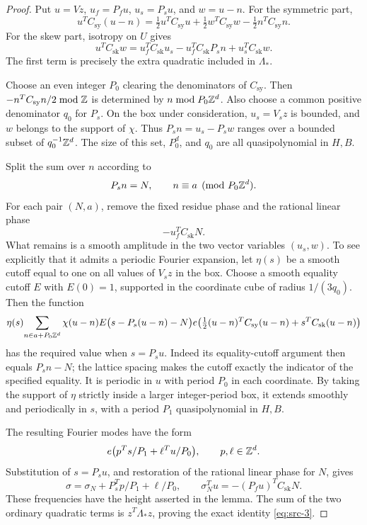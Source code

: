 \begin{proof}
Put \(u=Vz\), \(u_f=P_fu\), \(u_s=P_su\), and \(w=u-n\).
For the symmetric part,
\[
 u^TC_{\mathrm{sy}}(u-n)
 =\tfrac12u^TC_{\mathrm{sy}}u
  +\tfrac12w^TC_{\mathrm{sy}}w
  -\tfrac12n^TC_{\mathrm{sy}}n.
\]
For the skew part, isotropy on \(U\) gives
\[
 u^TC_{\mathrm{sk}}w
 =u_f^TC_{\mathrm{sk}}u_s
   -u_f^TC_{\mathrm{sk}}P_sn
   +u_s^TC_{\mathrm{sk}}w.
\]
The first term is precisely the extra quadratic included in
\(\Lambda_*\).

Choose an even integer \(P_0\) clearing the denominators of
\(C_{\mathrm{sy}}\).  Then
\(-n^TC_{\mathrm{sy}}n/2\bmod\mathbb Z\) is determined by
\(n\bmod P_0\mathbb Z^d\).
Also choose a common positive denominator \(q_0\) for \(P_s\).
On the box under consideration, \(u_s=V_sz\) is bounded, and
\(w\) belongs to the support of \(\chi\).
Thus \(P_sn=u_s-P_sw\) ranges over a bounded subset of
\(q_0^{-1}\mathbb Z^d\).  The size of this set, \(P_0^d\), and
\(q_0\) are all quasipolynomial in \(H,B\).

Split the sum over \(n\) according to
\[
 P_sn=N,\qquad n\equiv a\pmod{P_0\mathbb Z^d}.
\]
For each pair \((N,a)\), remove the fixed residue phase and the rational
linear phase
\[
 -u_f^TC_{\mathrm{sk}}N.
\]
What remains is a smooth amplitude in the two vector variables
\((u_s,w)\).  To see explicitly that it admits a periodic Fourier
expansion, let \(\eta(s)\) be a smooth cutoff equal to one on all
values of \(V_sz\) in the box.  Choose a smooth equality cutoff \(E\)
with \(E(0)=1\), supported in the coordinate cube of radius
\(1/(3q_0)\).  Then the function
\[
 \eta(s)\!
 \sum_{n\in a+P_0\mathbb Z^d}
 \chi(u-n)E\bigl(s-P_s(u-n)-N\bigr)
 e\!\left(\tfrac12(u-n)^TC_{\mathrm{sy}}(u-n)
                      +s^TC_{\mathrm{sk}}(u-n)\right)
\]
has the required value when \(s=P_su\).
Indeed its equality-cutoff argument then equals \(P_sn-N\);
the lattice spacing makes the cutoff exactly the indicator of the
specified equality.  It is periodic in \(u\) with period \(P_0\)
in each coordinate.  By taking the support of \(\eta\) strictly inside
a larger integer-period box, it extends smoothly and periodically
in \(s\), with a period \(P_1\) quasipolynomial in \(H,B\).

The resulting Fourier modes have the form
\[
 e\bigl(p^Ts/P_1+\ell^Tu/P_0\bigr),\qquad p,\ell\in\mathbb Z^d.
\]
Substitution of \(s=P_su\), and restoration of the rational linear
phase for \(N\), gives
\[
 \sigma=\sigma_N+P_s^Tp/P_1+\ell/P_0,
 \qquad
 \sigma_N^Tu=-(P_fu)^TC_{\mathrm{sk}}N.
\]
These frequencies have the height asserted in the lemma.  The sum
of the two ordinary quadratic terms is
\(z^T\Lambda_*z\), proving the exact identity
\eqref{eq:src-3}.


\end{proof}
